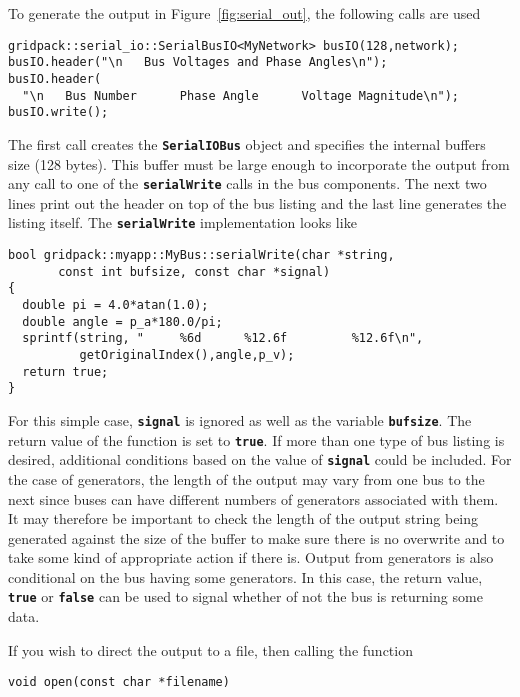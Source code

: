 To generate the output in Figure~\ref{fig:serial_out}, the following calls are used

{
\color{red}
\begin{Verbatim}[fontseries=b]
gridpack::serial_io::SerialBusIO<MyNetwork> busIO(128,network);
busIO.header("\n   Bus Voltages and Phase Angles\n");
busIO.header(
  "\n   Bus Number      Phase Angle      Voltage Magnitude\n");
busIO.write();
\end{Verbatim}
}

The first call creates the \texttt{\textbf{SerialIOBus}} object and specifies the internal buffers size (128 bytes). This buffer must be large enough to incorporate the output from any call to one of the \texttt{\textbf{serialWrite}} calls in the bus components. The next two lines print out the header on top of the bus listing and the last line generates the listing itself. The \texttt{\textbf{serialWrite}} implementation looks like

{
\color{red}
\begin{Verbatim}[fontseries=b]
bool gridpack::myapp::MyBus::serialWrite(char *string,
       const int bufsize, const char *signal)
{  
  double pi = 4.0*atan(1.0);
  double angle = p_a*180.0/pi;
  sprintf(string, "     %6d      %12.6f         %12.6f\n",
          getOriginalIndex(),angle,p_v);
  return true;
}
\end{Verbatim}
}

For this simple case, \texttt{\textbf{signal}} is ignored as well as the variable
\texttt{\textbf{bufsize}}. The return value of the function is set to
\texttt{\textbf{true}}. If more than one type of bus listing is desired,
additional conditions based on the value of \texttt{\textbf{signal}} could be
included. For the case of generators, the length of the output may vary from one
bus to the next since buses can have different numbers of generators associated
with them. It may therefore be important to check the length of the output
string being generated against the size of the buffer to make sure there is no
overwrite and to take some kind of appropriate action if there is. Output from
generators is also conditional on the bus having some generators. In this case,
the return value, \texttt{\textbf{true}} or \texttt{\textbf{false}} can be used
to signal whether of not the bus is returning some data.

If you wish to direct the output to a file, then calling the function

{
\color{red}
\begin{Verbatim}[fontseries=b]
void open(const char *filename)
\end{Verbatim}
}

